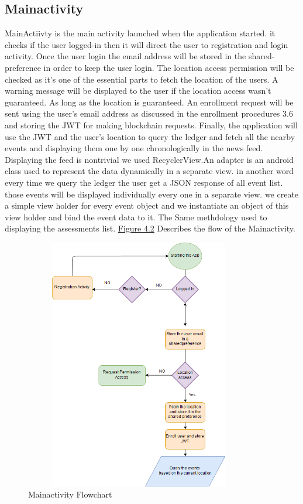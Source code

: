 \subsection{Mainactivity}
MainActiivty is the main activity launched when the application started. it checks if the user logged-in then it will direct the user to registration and login activity. 
Once the user login the email address will be stored in the shared-preference in order to keep the user login. The location access permission will be checked as it's one of the essential parts to fetch the location of the users. A warning message will be displayed to the user if the location access wasn't guaranteed. As long as the location is guaranteed. An enrollment request will be sent using the user's email address as discussed in the enrollment procedures 3.6 and storing the JWT for making blockchain requests. 
Finally, the application will use the JWT and the user's location to query the ledger and fetch all the nearby events and displaying them one by one chronologically in the news feed. 
Displaying the feed is nontrivial we used RecyclerView.An adapter is an android class used to represent the data dynamically in a separate view. in another word every time we query the ledger the user get a JSON response of all event list. those events will be displayed individually every one in a separate view. 
we create a simple view holder for every event object and we instantiate an object of this view holder and bind the event data to it.    
The Same methdology used to displaying the assessments list.
\hyperref[fig:mainactivityflow]{Figure 4.2} Describes the flow of the Mainactivity. 
 \begin{figure}[H]
\center
\includegraphics[width=10cm,height=11cm]{images/mainactivityflow.png}
\caption{Mainactivity Flowchart}
\label{fig:mainactivityflow}
\end{figure}

